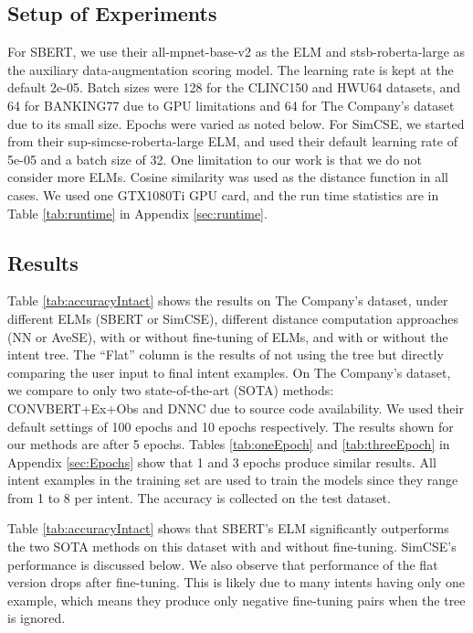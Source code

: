 \documentclass[sigconf, anonymous=true]{acmart}
\begin{document}
\subsection{\textbf{Setup of Experiments}}

For SBERT, we use their all-mpnet-base-v2 as the ELM and stsb-roberta-large as the auxiliary data-augmentation scoring model. The learning rate is kept at the default 2e-05. Batch sizes were 128 for the CLINC150 and HWU64 datasets, and 64 for BANKING77 due to GPU limitations and 64 for The Company's dataset due to its small size. Epochs were varied as noted below. For SimCSE, we started from their sup-simcse-roberta-large ELM, and used their default learning rate of 5e-05 and a batch size of 32. One limitation to our work is that we do not consider more ELMs. Cosine similarity was used as the distance function in all cases. We used one GTX1080Ti GPU card, and the run time statistics are in Table \ref{tab:runtime} in Appendix \ref{sec:runtime}.
 
\subsection{\textbf{Results}}

Table \ref{tab:accuracyIntact} shows the results on The Company's dataset, under different ELMs (SBERT or SimCSE), different distance computation approaches (NN or AveSE), with or without fine-tuning of ELMs, and with or without the intent tree. The “Flat” column is the results of not using the tree but directly comparing the user input to final intent examples. On The Company's dataset, we compare to only two state-of-the-art (SOTA) methods: CONVBERT+Ex+Obs \citep{mehri-eric-2021-example} and DNNC \citep{zhang-etal-2020-discriminative} due to source code availability. We used their default settings of 100 epochs and 10 epochs respectively. The results shown for our methods are after 5 epochs. Tables \ref{tab:oneEpoch} and \ref{tab:threeEpoch} in Appendix \ref{sec:Epochs} show that 1 and 3 epochs produce similar results. All intent examples in the training set are used to train the models since they range from 1 to 8 per intent. The accuracy is collected on the test dataset.  

Table \ref{tab:accuracyIntact} shows that SBERT's ELM significantly outperforms the two SOTA methods on this dataset with and without fine-tuning. SimCSE's performance is discussed below. We also observe that performance of the flat version drops after fine-tuning. This is likely due to many intents having only one example, which means they produce only negative fine-tuning pairs when the tree is ignored. 
\end{document}
